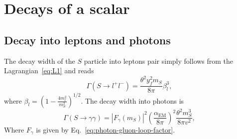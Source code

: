 \documentclass[a4paper,12pt,dvipsnames,usernames]{article}
\begin{document}
\section{Decays of a scalar}
\label{sec:decay}

\subsection{Decay into leptons and photons}
\label{sec:decayleptonphoton}

The decay width of the $S$ particle into leptons pair simply follows from the Lagrangian~\eqref{eq:L1} and reads
\begin{equation}
\Gamma (S \rightarrow l^+ l^-) 
= \frac{ \theta^2 y_{f}^{2} m_S}{8 \pi} \beta_{l}^{3},
\label{eq:Gll}
\end{equation}
where $\beta_{l} = \left( 1 - \frac{4 m_l^2}{m_S^2} \right)^{1/2}$.
The decay width into photons is
\begin{equation}
    \Gamma (S \rightarrow \gamma \gamma) =
    |F_{\gamma}(m_{S})|^2 \left( \frac{\alpha_{\text{EM}}}{8 \pi} \right)^2 \frac{\theta^2 m_S^3}{8 \pi v^2},
    \label{eq:Sto2gamma}
\end{equation}
Where $F_{\gamma}$ is given by Eq.~\eqref{eq:photon-gluon-loop-factor}.
\end{document}
